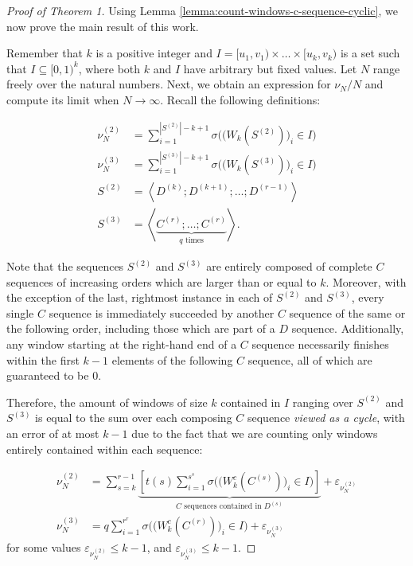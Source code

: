 \documentclass[11pt,a4paper]{tesis}
\theoremstyle{plain}
\theoremstyle{definition}
\begin{document}
\begin{proof}[Proof of Theorem 1]

  Using Lemma \ref{lemma:count-windows-c-sequence-cyclic}, we now prove the main result of this work.

  Remember that $k$ is a positive integer and $I = [u_1, v_1) \times \dots \times [u_k, v_k)$ is a set such that $I \subseteq [0, 1)^k$, where both $k$ and $I$ have arbitrary but fixed values. Let $N$ range freely over the natural numbers. Next, we obtain an expression for $\nu_N / N$ and compute its limit when $N \to \infty$. Recall the following definitions:

  \begin{equation*}
    \begin{aligned}
      \nu^{(2)}_N & = \sum_{i = 1}^{|S^{(2)}| - k + 1} \sigma\Big( \big( W_k(S^{(2)}) \big)_i \in I \Big) \\
      \nu^{(3)}_N & = \sum_{i = 1}^{|S^{(3)}| - k + 1} \sigma\Big( \big( W_k(S^{(3)}) \big)_i \in I \Big) \\
      S^{(2)} & = \left< D^{(k)} ; D^{(k + 1)} ; \dots ; D^{(r - 1)} \right> \\
      S^{(3)} & = \left< \underbrace{C^{(r)} ; \dots ; C^{(r)}}_{q \text{ times}} \right> \text{.}
    \end{aligned}
  \end{equation*}

  Note that the sequences $S^{(2)}$ and $S^{(3)}$ are entirely composed of complete $C$ sequences of increasing orders which are larger than or equal to $k$. Moreover, with the exception of the last, rightmost instance in each of $S^{(2)}$ and $S^{(3)}$, every single $C$ sequence is immediately succeeded by another $C$ sequence of the same or the following order, including those which are part of a $D$ sequence. Additionally, any window starting at the right-hand end of a $C$ sequence necessarily finishes within the first $k - 1$ elements of the following $C$ sequence, all of which are guaranteed to be $0$.

  Therefore, the amount of windows of size $k$ contained in $I$ ranging over $S^{(2)}$ and $S^{(3)}$ is equal to the sum over each composing $C$ sequence \textit{viewed as a cycle}, with an error of at most $k - 1$ due to the fact that we are counting only windows entirely contained within each sequence:

  \begin{equation*}
    \begin{aligned}
      \nu^{(2)}_N & = \sum_{s = k}^{r - 1} \underbrace{\left[ t(s) \sum_{i = 1}^{s^s} \sigma\Big( \big( W^c_k(C^{(s)}) \big)_i \in I \Big) \right]}_{\text{$C$ sequences contained in $D^{(s)}$}} + \varepsilon_{\nu^{(2)}_N} \\
      \nu^{(3)}_N & = q \sum_{i = 1}^{r^r} \sigma\Big( \big( W^c_k(C^{(r)}) \big)_i \in I \Big)  + \varepsilon_{\nu^{(3)}_N}
    \end{aligned}
  \end{equation*}
  for some values $\varepsilon_{\nu^{(2)}_N} \le k - 1$, and $\varepsilon_{\nu^{(3)}_N} \le k - 1$.


\end{proof}
\end{document}
